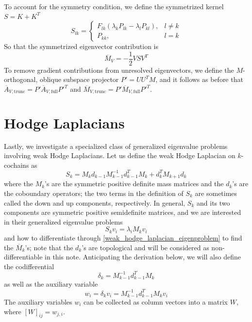 \documentclass[11pt, a4paper]{article}
\begin{document}
To account for the symmetry condition, we define the symmetrized kernel $S = K + K^T$
\begin{equation}
    S_{lk} = \begin{cases}
        F_{lk}(\lambda_kP_{lk} - \lambda_lP_{kl}), & l\ne k \\
        P_{kk}, & l = k
    \end{cases}
\end{equation}
So that the symmetrized eigenvector contribution is
\begin{equation}
\boxed{
    \overline{M}_V = -\frac 1 2 VSV^T
    \label{dLdM_via_eigenvectors_sym}
}
\end{equation}
To remove gradient contributions from unresolved eigenvectors, we define the $M$-orthogonal, oblique subspace projector $P'=UU^TM$, and it follows as before that $\overline{A}_{V,\text{trunc}} = P'\overline{A}_{V,\text{full}}P'^T$ and $\overline{M}_{V,\text{trunc}} = P'\overline{M}_{V,\text{full}}P'^T$.


\section{Hodge Laplacians}

Lastly, we investigate a specialized class of generalized eigenvalue problems involving weak Hodge Laplacians. Let us define the weak Hodge Laplacian on $k$-cochains as
\begin{equation}
    S_k = M_k d_{k-1} M_{k-1}^{-1} d_{k-1}^T M_k + d_k^T M_{k+1} d_k
    \label{weak_hodge_laplacian}
\end{equation}
where the $M_k$'s are the symmetric positive definite mass matrices and the $d_k$'s are the coboundary operators; the two terms in the definition of $S_k$ are sometimes called the down and up components, respectively. In general, $S_k$ and its two components are symmetric positive semidefinite matrices, and we are interested in their generalized eigenvalue problems
\begin{equation}
    S_k v_i = \lambda_i M_k v_i
    \label{weak_hodge_laplacian_eigenproblem}
\end{equation}
and how to differentiate through \eqref{weak_hodge_laplacian_eigenproblem} to find the $\overline M_k$'s; note that the $d_k$'s are topological and will be considered as non-differentiable in this note. Anticipating the derivation below, we will also define the codifferential
\begin{equation}
    \delta_k = M_{k-1}^{-1}d_{k-1}^TM_k
\end{equation}
as well as the auxiliary variable
\begin{equation}
    w_i = \delta_k v_i = M_{k-1}^{-1}d_{k-1}^TM_k v_i
\end{equation}
The auxiliary variables $w_i$ can be collected as column vectors into a matrix $W$, where $[W]_{ij}=w_{j,i}$.
\end{document}
